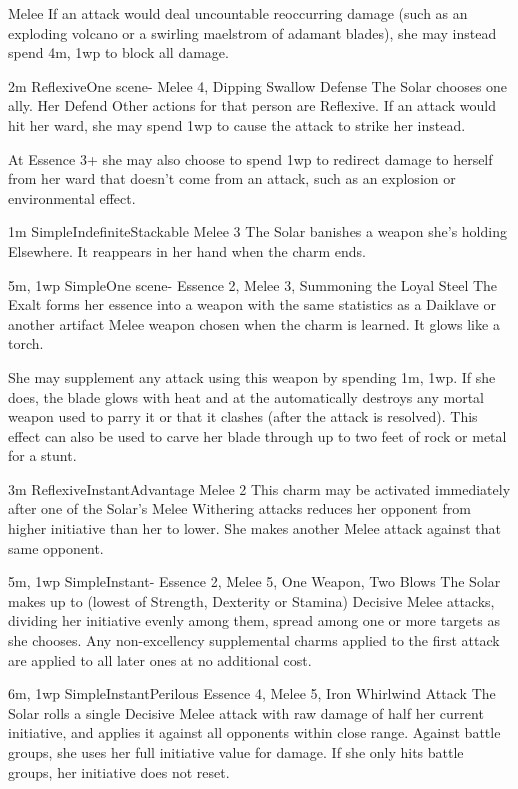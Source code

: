\begin{Ability}{Melee}
  If an attack would deal uncountable reoccurring damage (such as an exploding volcano or a swirling maelstrom of adamant blades), she may instead spend 4m, 1wp to block all damage.

  {2m}
  {Reflexive}{One scene}{-}
  {Melee 4, Dipping Swallow Defense}
  The Solar chooses one ally. Her Defend Other actions for that person are Reflexive. If an attack would hit her ward, she may spend 1wp to cause the attack to strike her instead.

  At Essence 3+ she may also choose to spend 1wp to redirect damage to herself from her ward that doesn't come from an attack, such as an explosion or environmental effect.

  {1m}
  {Simple}{Indefinite}{Stackable}
  {Melee 3}
  The Solar banishes a weapon she's holding Elsewhere. It reappears in her hand when the charm ends.

  {5m, 1wp}
  {Simple}{One scene}{-}
  {Essence 2, Melee 3, Summoning the Loyal Steel}
  The Exalt forms her essence into a weapon with the same statistics as a Daiklave or another artifact Melee weapon chosen when the charm is learned. It glows like a torch.

  She may supplement any attack using this weapon by spending 1m, 1wp. If she does, the blade glows with heat and at the automatically destroys any mortal weapon used to parry it or that it clashes (after the attack is resolved). This effect can also be used to carve her blade through up to two feet of rock or metal for a stunt.

  {3m}
  {Reflexive}{Instant}{Advantage}
  {Melee 2}
  This charm may be activated immediately after one of the Solar's Melee Withering attacks reduces her opponent from higher initiative than her to lower. She makes another Melee attack against that same opponent.

  {5m, 1wp}
  {Simple}{Instant}{-}
  {Essence 2, Melee 5, One Weapon, Two Blows}
  The Solar makes up to (lowest of Strength, Dexterity or Stamina) Decisive Melee attacks, dividing her initiative evenly among them, spread among one or more targets as she chooses. Any non-excellency supplemental charms applied to the first attack are applied to all later ones at no additional cost.

  {6m, 1wp}
  {Simple}{Instant}{Perilous}
  {Essence 4, Melee 5, Iron Whirlwind Attack}
  The Solar rolls a single Decisive Melee attack with raw damage of half her current initiative, and applies it against all opponents within close range. Against battle groups, she uses her full initiative value for damage. If she only hits battle groups, her initiative does not reset.
\end{Ability}

